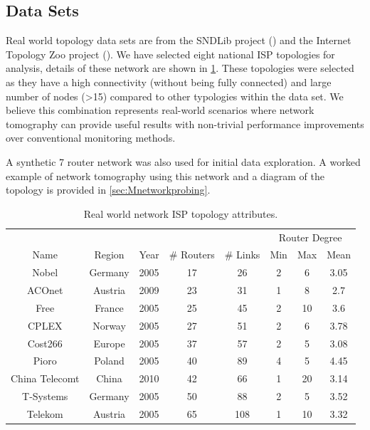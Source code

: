 \subsection{Data Sets}
\label{ssec:Mdatasets}
Real world topology data sets are from the SNDLib project (\cite{orlowski_sndlib_2007}) and the Internet Topology Zoo project (\cite{knight_internet_2011}). We have selected eight national ISP topologies for analysis, details of these network are shown in \cref{tbl:Mrealnetworkattributes}. These topologies were selected as they have a high connectivity (without being fully connected) and large number of nodes (>15) compared to other typologies within the data set. We believe this combination represents real-world scenarios where network tomography can provide useful results with non-trivial performance improvements over conventional monitoring methods.\par
A synthetic 7 router network was also used for initial data exploration. A worked example of network tomography using this network and a diagram of the topology is provided in \cref{sec:Mnetworkprobing}.\par
  \begin{table}
    \centering
    \begin{tabular}{@{}cccccccc@{}} 
      \toprule
      &&&&&\multicolumn{3}{c}{Router Degree}\\
      \cmidrule{6-8}
      Name & Region & Year & \# Routers & \# Links & Min & Max & Mean \\
      \midrule
      Nobel & Germany & 2005 & 17 & 26 & 2 & 6 & 3.05\\
      ACOnet & Austria & 2009 & 23 & 31 & 1 & 8 & 2.7\\
      Free & France & 2005 & 25 & 45 & 2 & 10 & 3.6\\
      CPLEX & Norway & 2005 & 27 & 51 & 2 & 6 & 3.78\\
      Cost266 & Europe & 2005 & 37 & 57 & 2 & 5 & 3.08\\
      Pioro & Poland & 2005 & 40 & 89 & 4 & 5 & 4.45\\
      China Telecomt & China & 2010 & 42 & 66 & 1 & 20 & 3.14\\
      T-Systems & Germany & 2005 & 50 & 88 & 2 & 5 & 3.52\\
      Telekom & Austria & 2005 & 65 & 108 & 1 & 10 & 3.32\\
      \bottomrule
    \end{tabular}
    \caption{Real world network ISP topology attributes.}
    \label{tbl:Mrealnetworkattributes}
  \end{table}

